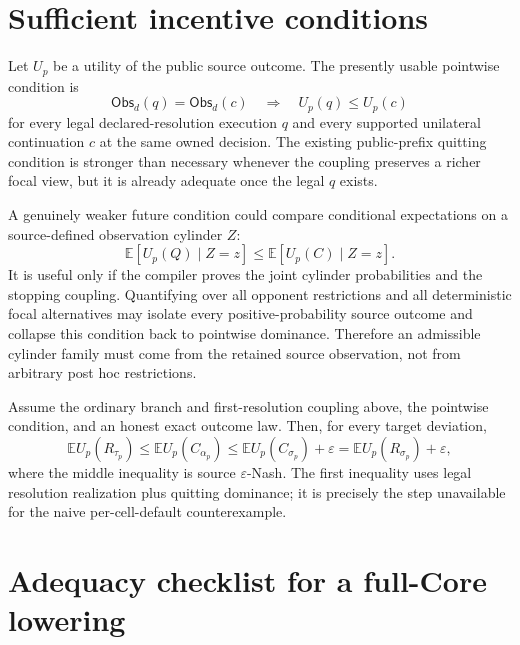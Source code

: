 \documentclass[11pt]{article}
\newcommand{\Obs}{\mathsf{Obs}}
\begin{document}
\section{Sufficient incentive conditions}

Let $U_p$ be a utility of the public source outcome.  The presently usable
pointwise condition is
\[
 \Obs_d(q)=\Obs_d(c)
 \quad\Longrightarrow\quad
 U_p(q)\leq U_p(c)
\]
for every legal declared-resolution execution $q$ and every supported
unilateral continuation $c$ at the same owned decision.  The existing
public-prefix quitting condition is stronger than necessary whenever the
coupling preserves a richer focal view, but it is already adequate once the
legal $q$ exists.

A genuinely weaker future condition could compare conditional expectations on
a source-defined observation cylinder $Z$:
\[
 \mathbb{E}[U_p(Q)\mid Z=z]
 \leq
 \mathbb{E}[U_p(C)\mid Z=z].
\]
It is useful only if the compiler proves the joint cylinder probabilities and
the stopping coupling.  Quantifying over all opponent restrictions and all
deterministic focal alternatives may isolate every positive-probability source
outcome and collapse this condition back to pointwise dominance.  Therefore an
admissible cylinder family must come from the retained source observation, not
from arbitrary post hoc restrictions.

Assume the ordinary branch and first-resolution coupling above, the pointwise
condition, and an honest exact outcome law.  Then, for every target deviation,
\[
 \mathbb{E}U_p(R_{\tau_p})
 \leq \mathbb{E}U_p(C_{\alpha_p})
 \leq \mathbb{E}U_p(C_{\sigma_p})+\varepsilon
 = \mathbb{E}U_p(R_{\sigma_p})+\varepsilon,
\]
where the middle inequality is source $\varepsilon$-Nash.  The first inequality
uses legal resolution realization plus quitting dominance; it is precisely the
step unavailable for the naive per-cell-default counterexample.

\section{Adequacy checklist for a full-Core lowering}
\end{document}
